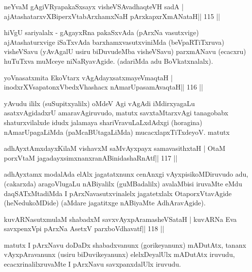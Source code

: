 
\begin{shl}
neYvaM gAgiVRyapakaSxsayx visheVSAvadhaqteVH sadA |
ajAtashatarxvXBiperxVtabArxhamxNaH pArxkapxrXmANataH\hfill || 115 ||
\end{shl}

\begin{artha}
hiVgU sariyalalx - gAgayxRna pakaSxvAda (pArxNa vasutxvige) ajAtashaturxvige iSaTxvAda barxhamxvasutxviniMda (beVpaRTiTxruva) visheVSavu (yAvAgalU usiru biDuvudeMba visheVSavu) parxmANavu (ecacxru) huTuTxva muMceye niNaRyavAgide. (adariMda adu BoVkatxnalalx).
\end{artha}


\begin{shl}
yoV\s nasatxmita EkoV\s tarx vAgAdayxsatxmayeV\s maqtaH |
inodxrXV\s sapatonxV\s bedxVhashacx nAmarUpasamAvaqtaH\hfill || 116 ||
\end{shl}

\begin{artha}
yAvudu ililx (suSupitxyalilx) oMdeV Agi vAgAdi iMdirxyagaLu asatxvAgidadxrU amaravAgiruvudo, matutx savxtaMtarxvAgi tanagobabx shaturxvilalxde idudx jalamaya shariVravuLaLxdAdxgi (horagina) nAmarUpagaLiMda (paMcaBUtagaLiMda) mucacxlapxTiTxdeyoV. matutx
\end{artha}

\begin{shl}
adhAyxtAmxdayxKilaM vishavxM saMvAyxpayx samavasithxtaH |
OtaM porxVtaM jagadayxsimxnanxranABinidashaRnAtf\hfill || 117 ||
\end{shl}

\begin{artha}
adhAyxtamx modalAda elAlx jagatatxnunx cenAnxgi vAyxpisikoMDiruvudo  adu, (cakarxda) aragoVlugaLu nABiyalilx (guMBadalilx) avalaMbisi  iruvaMte eMdu daqSATxMtadiMda I pArxNavasutxvinalelx jagatetxlalx OtaporxVtavAgide (heNedukoMDide) (aMdare jagatitxge nABiyaMte AdhAravAgide).  
\end{artha}

\begin{shl}
kuvARNasutxmulaM shabadxM savxvAyxpAramasheVSataH |
kuvARNa Eva savxpenxV\s pi pArxNa AsetxV parxboVdhavatf\hfill || 118 ||
\end{shl}

\begin{artha}
matutx I pArxNavu doDaDx shabadxvanunx (gorikeyanunx) mADutAtx, tananx vAyxpAravanunx (usiru biDuvikeyanunx) elelxDeyalUlx mADutAtx iruvudu, ecacxrinalilxruvaMte I pArxNavu savxpanxdalUlx iruvudu.
\end{artha}

